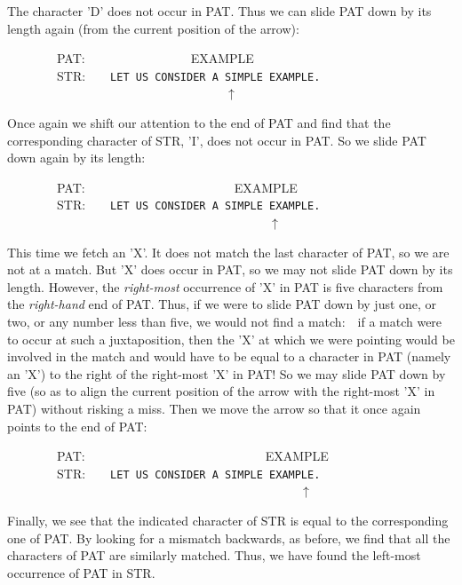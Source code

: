 \documentclass[11pt]{book}
\newenvironment{pubasis}{\begin{flushleft}\ttfamily\small}{\normalsize\rmfamily\end{flushleft}}
\newcommand{\pubinlineunderline}[1]{\emph{#1}}
\begin{document}
The character 'D' does not occur in PAT.  Thus we can slide PAT down
by its length again (from the current position of the arrow):
\begin{pubasis}
~~~~~~~~PAT:~~~~~~~~~~~~~~~~~EXAMPLE\\
~~~~~~~~STR:~~~~\verb*+LET US CONSIDER A SIMPLE EXAMPLE.+\\
~~~~~~~~~~~~~~~~~~~~~~~~~~~~~~~~~~~$\uparrow$\\
\end{pubasis}
Once again we shift our attention to the end of PAT and find that
the corresponding character of STR, 'I', does not occur in PAT.
So we slide PAT down again by its length:
\begin{pubasis}
~~~~~~~~PAT:~~~~~~~~~~~~~~~~~~~~~~~~EXAMPLE\\
~~~~~~~~STR:~~~~\verb*+LET US CONSIDER A SIMPLE EXAMPLE.+\\
~~~~~~~~~~~~~~~~~~~~~~~~~~~~~~~~~~~~~~~~~~$\uparrow$\\
\end{pubasis}
This time we fetch an 'X'.  It does not match the last character
of PAT, so we are not at a match.  But 'X' does occur in PAT, so we
may not slide PAT down by its length.  However, the
\pubinlineunderline{right-most} occurrence of 'X' in PAT is five characters from the \pubinlineunderline{right-hand}
end of PAT.  Thus, if we were to slide PAT down by just one, or two, or any
number less than five, we would not find a match:~~if a match were to occur
at such a juxtaposition, then the 'X' at which we were pointing would be involved
in the match and would have to be equal to a character in PAT (namely an 'X') to the right
of the right-most 'X' in PAT!  So we may slide PAT down by five (so as
to align the current position of the arrow with
the right-most 'X' in PAT) without risking a miss.  Then we move the arrow 
so that it once again points to the end of PAT:
\begin{pubasis}
~~~~~~~~PAT:~~~~~~~~~~~~~~~~~~~~~~~~~~~~~EXAMPLE\\
~~~~~~~~STR:~~~~\verb*+LET US CONSIDER A SIMPLE EXAMPLE.+\\
~~~~~~~~~~~~~~~~~~~~~~~~~~~~~~~~~~~~~~~~~~~~~~~$\uparrow$\\
\end{pubasis}
Finally, we see that the indicated character of STR is equal to the corresponding
one of PAT.  By looking for a mismatch backwards, as before, we
find that all the characters of PAT are similarly matched.  Thus,
we have found the left-most occurrence of PAT in STR.
\end{document}
